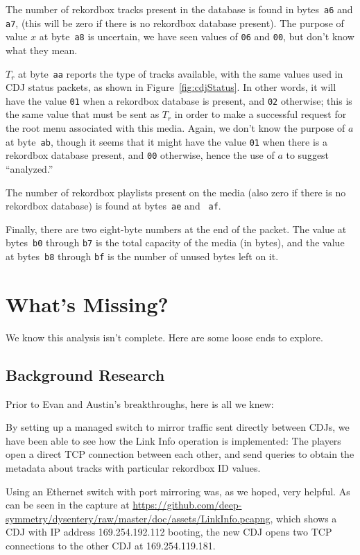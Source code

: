\documentclass[11pt]{article}
\begin{document}
The number of rekordbox tracks present in the database is found in
bytes~{\tt a6} and {\tt a7}, (this will be zero if there is no
rekordbox database present). The purpose of value $x$ at byte~{\tt a8}
is uncertain, we have seen values of {\tt 06} and {\tt 00}, but don't
know what they mean.

$T_r$ at byte~{\tt aa} reports the type of tracks available, with the
same values used in CDJ status packets, as shown in
Figure~\ref{fig:cdjStatus}. In other words, it will have the value
{\tt 01} when a rekordbox database is present, and {\tt 02} otherwise;
this is the same value that must be sent as $T_r$ in order to make a
successful request for the root menu associated with this media.
Again, we don't know the purpose of $a$ at byte~{\tt ab}, though it
seems that it might have the value {\tt 01} when there is a rekordbox
database present, and {\tt 00} otherwise, hence the use of $a$ to
suggest ``analyzed.''

The number of rekordbox playlists present on the media (also zero if
there is no rekordbox database) is found at bytes~{\tt ae} and {\tt
  af}.

Finally, there are two eight-byte numbers at the end of the packet.
The value at bytes~{\tt b0} through {\tt b7} is the total capacity of
the media (in bytes), and the value at bytes~{\tt b8} through {\tt bf}
is the number of unused bytes left on it.

\section{What's Missing?}

We know this analysis isn't complete. Here are some loose ends to
explore.

\subsection{Background Research}

Prior to Evan and Austin's breakthroughs, here is all we knew:

By setting up a managed switch to mirror traffic sent directly between
CDJs, we have been able to see how the Link Info operation is
implemented: The players open a direct TCP connection between each
other, and send queries to obtain the metadata about tracks with
particular rekordbox ID values.

Using an Ethernet switch
with port mirroring was, as we hoped, very helpful. As can be seen in
the capture at
\url{https://github.com/deep-symmetry/dysentery/raw/master/doc/assets/LinkInfo.pcapng},
which shows a CDJ with IP address 169.254.192.112 booting, the new CDJ
opens two TCP connections to the other CDJ at 169.254.119.181.
\end{document}
